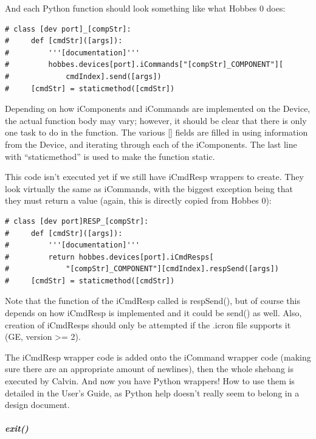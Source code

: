 \documentclass[12pt,letterpaper]{article}
\begin{document}
And each Python function should look something like what Hobbes 0 does:

\selectfont

\begin{lstlisting}
# class [dev port]_[compStr]:
#     def [cmdStr]([args]):
#         '''[documentation]'''
#         hobbes.devices[port].iCommands["[compStr]_COMPONENT"][
#             cmdIndex].send([args])
#     [cmdStr] = staticmethod([cmdStr])
\end{lstlisting}

\selectfont

Depending on how iComponents and iCommands are implemented on the Device, the actual function body may vary; however, it should be clear that there is only one task to do in the function. The various [] fields are filled in using information from the Device, and iterating through each of the iComponents. The last line with ``staticmethod'' is used to make the function static.

This code isn't executed yet if we still have iCmdResp wrappers to create. They look virtually the same as iCommands, with the biggest exception being that they must return a value (again, this is directly copied from Hobbes 0):

\selectfont

\begin{lstlisting}
# class [dev port]RESP_[compStr]:
#     def [cmdStr]([args]):
#         '''[documentation]'''
#         return hobbes.devices[port].iCmdResps[
#             "[compStr]_COMPONENT"][cmdIndex].respSend([args])
#     [cmdStr] = staticmethod([cmdStr])
\end{lstlisting}

\selectfont

Note that the function of the iCmdResp called is respSend(), but of course this depends on how iCmdResp is implemented and it could be send() as well. Also, creation of iCmdResps should only be attempted if the .icron file supports it (GE, version >= 2).

The iCmdResp wrapper code is added onto the iCommand wrapper code (making sure there are an appropriate amount of newlines), then the whole shebang is executed by Calvin. And now you have Python wrappers! How to use them is detailed in the User's Guide, as Python help doesn't really seem to belong in a design document.



%
%
\subparagraph{exit()}
\label{4.1.1.0.4}
\end{document}
